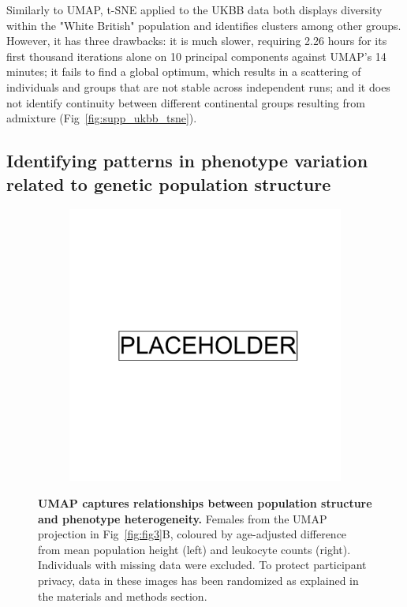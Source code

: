 Similarly to UMAP, t-SNE applied to the UKBB data both displays diversity within the "White British" population and identifies clusters among other groups. However, it has three drawbacks: it is much slower, requiring 2.26 hours for its first thousand iterations alone on 10 principal components against UMAP's 14 minutes; it fails to find a global optimum, which results in a scattering of individuals and groups that are not stable across independent runs; and it does not identify continuity between different continental groups resulting from admixture (Fig~\ref{fig:supp_ukbb_tsne}). 

\subsection{Identifying patterns in phenotype variation related to genetic population structure} 

\begin{figure}
    \centering
    \begin{subfigure}{\columnwidth}
    \includegraphics[width=0.8\columnwidth]{placeholder.png}
    \caption{}
    \label{fig:umap_height_female}
    \end{subfigure}
      \caption[UMAP captures relationships between population structure and phenotype heterogeneity.]{\textbf{UMAP captures relationships between population structure and phenotype heterogeneity.} Females from the UMAP projection in Fig~\ref{fig:fig3}B, coloured by age-adjusted difference from mean population height (left) and leukocyte counts (right). Individuals with missing data were excluded. To protect participant privacy, data in these images has been randomized as explained in the materials and methods section.}
\label{fig:fig6}
\end{figure}

